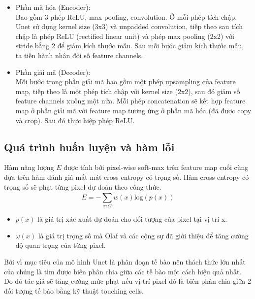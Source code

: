 \begin{itemize}
    \item Phần mã hóa (Encoder):\\
    Bao gồm 3 phép ReLU, max pooling, convolution. Ở mỗi phép tích chập, Unet sử dụng kernel size (3x3) và unpadded convolution, tiếp theo sau tích chập là phép ReLU (rectified linear unit) và phép max pooling (2x2) với stride bằng 2 để giảm kích thước mẫu. Sau mỗi bước giảm kích thước mẫu, ta tiến hành nhân đôi số feature channels. 
    
    \item Phần giải mã (Decoder):\\
    Mỗi bước trong phần giải mã bao gồm một phép upsampling  của feature map, tiếp theo là một phép tích chập với kernel size (2x2), sau đó giảm số feature channels xuống một nửa. Mỗi phép concatenation sẽ kết hợp feature map ở phần giải mã với feature map tương ứng ở phần mã hóa (đã được copy và crop). Sau đó thực hiệp phép ReLU. 
\end{itemize}

\newpage

\subsection{Quá trình huấn luyện và hàm lỗi}
Hàm năng lượng $E$ được tính bởi pixel-wise soft-max trên feature map cuối cùng dựa trên hàm đánh giá mất mát cross entropy có trọng số. Hàm  cross entropy có trọng số sẽ phạt từng pixel dự đoán theo công thức.
\begin{equation}
    E = -\sum_{x \epsilon \Omega}^{ } w(x)\mathrm{log}(p(x))
\end{equation}
\begin{itemize}
\setlength\itemsep{5mm}
    \item $p(x)$ là giá trị xác xuất dự đoán cho đối tượng của pixel tại vị trí x.
    \item $\omega(x)$ là giá trị trọng số mà Olaf và các cộng sự đã giới thiệu để tăng cường độ quan trọng của từng pixel. 
\end{itemize}

Bởi vì mục tiêu của mô hình Unet là phân đoạn tế bào nên thách thức lớn nhất của chúng là tìm được biên phân chia giữa các tế bào một cách hiệu quả nhất. Do đó tác giả sẽ tăng cường mức phạt nếu vị trí pixel đó là biên phân chia giữa 2 đối tượng tế bào bằng kỹ thuật touching cells. 

